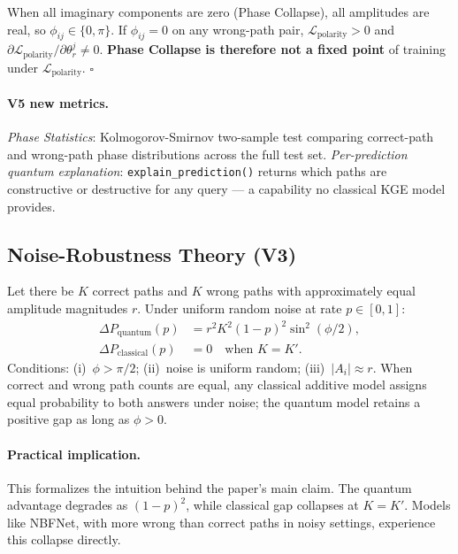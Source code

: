 \documentclass[runningheads]{llncs}
\begin{document}
\begin{theorem}
\label{thm:v52}
When all imaginary components are zero (Phase Collapse), all amplitudes are
real, so $\phi_{ij}\in\{0,\pi\}$.  If $\phi_{ij}=0$ on any wrong-path pair,
$\mathcal{L}_\mathrm{polarity}>0$ and
$\partial\mathcal{L}_\mathrm{polarity}/\partial\theta_r^j\neq 0$.
\textbf{Phase Collapse is therefore not a fixed point} of training under
$\mathcal{L}_\mathrm{polarity}$.  \hfill$\square$
\end{theorem}

\paragraph{V5 new metrics.}
\textit{Phase Statistics}: Kolmogorov-Smirnov two-sample test comparing
correct-path and wrong-path phase distributions across the full test set.
\textit{Per-prediction quantum explanation}: \texttt{explain\_prediction()}
returns which paths are constructive or destructive for any query --- a
capability no classical KGE model provides.

\subsection{Noise-Robustness Theory (V3)}
\label{sec:theory}

\begin{theorem}
\label{thm:83}
Let there be $K$ correct paths and $K$ wrong paths with approximately equal
amplitude magnitudes $r$.  Under uniform random noise at rate $p\in[0,1]$:
\begin{align}
  \Delta P_\mathrm{quantum}(p)  &= r^2K^2(1-p)^2\sin^2(\phi/2),\label{eq:qgap}\\
  \Delta P_\mathrm{classical}(p) &= 0\quad\text{when }K=K'.\label{eq:cgap}
\end{align}
Conditions: (i)~$\phi>\pi/2$; (ii)~noise is uniform random;
(iii)~$|A_i|\approx r$.  When correct and wrong path counts are equal, any
classical additive model assigns equal probability to both answers under noise;
the quantum model retains a positive gap as long as $\phi>0$.
\end{theorem}

\paragraph{Practical implication.}
This formalizes the intuition behind the paper's main claim.  The quantum
advantage degrades as $(1-p)^2$, while classical gap collapses at $K=K'$.
Models like NBFNet, with more wrong than correct paths in noisy settings,
experience this collapse directly.
\end{document}
